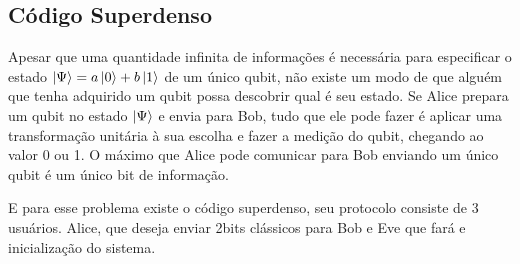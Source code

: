 \documentclass[a4paper, 12pt, oneside]{book}
\begin{document}
\subsection{Código Superdenso}

Apesar que uma quantidade infinita de informações é necessária para especificar o estado $\ket{\Psi}=a\ket{0}+b\ket{1}$ de um único qubit, não existe um modo de que alguém que tenha adquirido um qubit possa descobrir qual é seu estado. Se Alice prepara um qubit no estado $\ket{\Psi}$ e envia para Bob, tudo que ele pode fazer é aplicar uma transformação unitária à sua escolha e fazer a medição do qubit, chegando ao valor 0 ou 1. O máximo que Alice pode comunicar para Bob enviando um único qubit é um único bit de informação.

E para esse problema existe o código superdenso, seu protocolo consiste de 3 usuários. Alice, que deseja enviar 2bits clássicos para Bob e Eve que fará e inicialização do sistema.
\end{document}
